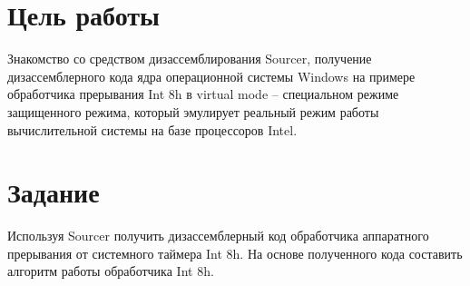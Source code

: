 \section*{Цель работы}

Знакомство со средством дизассемблирования Sourcer,
получение дизассемблерного кода ядра операционной
системы Windows на примере обработчика прерывания Int
8h в virtual mode -- специальном режиме защищенного
режима, который эмулирует реальный режим работы
вычислительной системы на базе процессоров Intel.

\section*{Задание}

Используя Sourcer получить дизассемблерный код
обработчика аппаратного прерывания от системного
таймера Int 8h. На основе полученного кода составить
алгоритм работы обработчика Int 8h.
